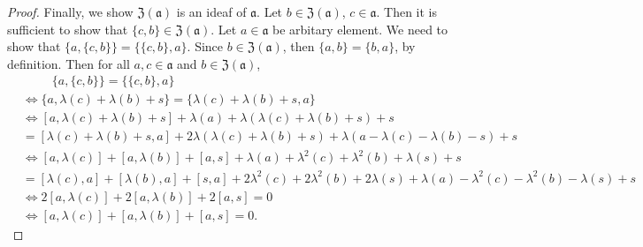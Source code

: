 \documentclass{article}
\theoremstyle{definition}
\theoremstyle{remark}
\theoremstyle{plain}
\begin{document}
\begin{proof}
Finally, we show $\mathfrak{Z(a)}$ is an ideaf of $\mathfrak{a}$. Let $b\in \mathfrak{Z(a)}$, $c\in \mathfrak{a}$. Then it is sufficient to show that $\{c,b\}\in \mathfrak{Z(a)}$. Let $a\in \mathfrak{a}$ be arbitary element. We need to show that $\{a,\{c,b\}\}=\{\{c, b\}, a\}$. Since $b\in \mathfrak{Z(a)}$, then $\{a, b\}=\{b,a\}$, by definition. Then for all $a, c \in \mathfrak{a}$ and $b\in \mathfrak{Z(a)}$,
\begin{align*}
    &~~~~~~~~~~~\{a,\{c,b\}\}=\{\{c, b\}, a\}\\
    &\iff \{a, \lambda(c)+\lambda(b)+s\}=\{\lambda(c)+\lambda(b)+s, a\}\\
    &\iff [a, \lambda(c)+\lambda(b)+s]+\lambda(a)+\lambda(\lambda(c)+\lambda(b)+s)+s\\
    &=[\lambda(c)+\lambda(b)+s, a]+2\lambda(\lambda(c)+\lambda(b)+s)+\lambda(a-\lambda(c)-\lambda(b)-s)+s\\
    &\iff [a, \lambda(c)]+[a, \lambda(b)]+[a,s]+\lambda(a)+\lambda^2(c)+\lambda^2(b)+\lambda(s)+s\\
    &=[\lambda(c),a]+[\lambda(b),a]+[s,a]+2\lambda^2(c)+2\lambda^2(b)+2\lambda(s)+\lambda(a)-\lambda^2(c)
-\lambda^2(b)-\lambda(s)+s\\
   &\iff 2[a, \lambda(c)]+2[a, \lambda(b)]+2[a, s]=0\\
   &\iff [a, \lambda(c)]+[a, \lambda(b)]+[a, s]=0.
\end{align*}

\end{proof}
\end{document}
